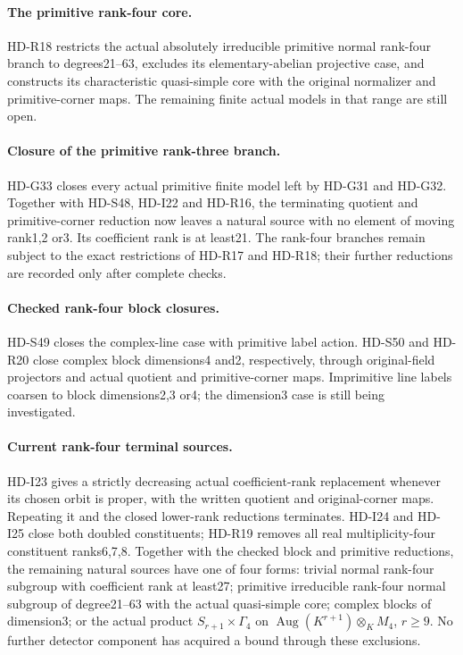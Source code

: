 \paragraph{The primitive rank-four core.}
HD-R18 restricts the actual absolutely irreducible primitive
normal rank-four branch to degrees21--63, excludes its
elementary-abelian projective case, and constructs its
characteristic quasi-simple core with the original
normalizer and primitive-corner maps. The remaining
finite actual models in that range are still open.


\paragraph{Closure of the primitive rank-three branch.}
HD-G33 closes every actual primitive finite model left by
HD-G31 and HD-G32. Together with HD-S48, HD-I22 and HD-R16,
the terminating quotient and primitive-corner reduction now
leaves a natural source with no element of moving rank1,2 or3.
Its coefficient rank is at least21. The rank-four branches
remain subject to the exact restrictions of HD-R17 and HD-R18;
their further reductions are recorded only after complete checks.


\paragraph{Checked rank-four block closures.}
HD-S49 closes the complex-line case with primitive label action.
HD-S50 and HD-R20 close complex block dimensions4 and2,
respectively, through original-field projectors and actual
quotient and primitive-corner maps. Imprimitive line labels
coarsen to block dimensions2,3 or4; the dimension3 case
is still being investigated.


\paragraph{Current rank-four terminal sources.}
HD-I23 gives a strictly decreasing actual coefficient-rank
replacement whenever its chosen orbit is proper, with the
written quotient and original-corner maps. Repeating it and
the closed lower-rank reductions terminates. HD-I24 and HD-I25
close both doubled constituents; HD-R19 removes all real
multiplicity-four constituent ranks6,7,8. Together with the
checked block and primitive reductions, the remaining natural
sources have one of four forms: trivial normal rank-four
subgroup with coefficient rank at least27; primitive irreducible
rank-four normal subgroup of degree21--63 with the actual
quasi-simple core; complex blocks of dimension3; or the actual
product \(S_{r+1}\times\Gamma_4\) on
\(\operatorname{Aug}(K^{r+1})\otimes_K M_4\), \(r\ge9\).
No further detector component has acquired a bound through
these exclusions.


